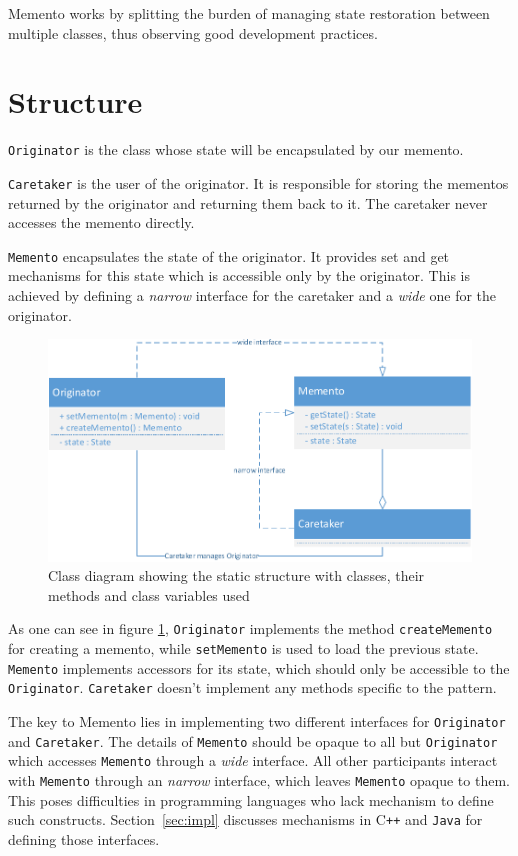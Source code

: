 \documentclass[11pt, a4paper, twoside]{article}
\def\cpp{C{}\texttt{++}}
\begin{document}
	 Memento works by splitting the burden of managing state restoration between multiple classes, thus observing good development practices.
	 	
	\section{Structure}
	\verb|Originator| is the class whose state will be encapsulated by our memento.
	
	\verb|Caretaker| is the user of the originator. It is responsible for storing the mementos returned by the originator and returning them back to it. The caretaker never accesses the memento directly.
	
	\verb|Memento| encapsulates the state of the originator. It provides set and get mechanisms for this state which is accessible only by the originator. This is achieved by defining a \emph{narrow} interface for the caretaker and a \emph{wide} one for the originator.
	
	\begin{figure}[htb]
		\begin{center}
			\includegraphics[width=\textwidth]{class_diagram.pdf}
			\caption{Class diagram showing the static structure with classes, their methods and class variables used}
			\label{fig:class}
		\end{center}
	\end{figure}
	
	As one can see in figure \ref{fig:class}, \verb|Originator| implements the method \verb|createMemento| for creating a memento, while \verb|setMemento| is used to load the previous state. \verb|Memento| implements accessors for its state, which should only be accessible to the \verb|Originator|. \verb|Caretaker| doesn't implement any methods specific to the pattern.
	
	The key to Memento lies in implementing two different interfaces for \verb|Originator| and \verb|Caretaker|. The details of \verb|Memento| should be opaque to all but \verb|Originator| which accesses \verb|Memento| through a \emph{wide} interface. All other participants interact with \verb|Memento| through an \emph{narrow} interface, which leaves \verb|Memento| opaque to them. This poses difficulties in programming languages who lack mechanism to define such constructs. Section~\ref{sec:impl} discusses mechanisms in \cpp{} and \verb|Java| for defining those interfaces.
	
\end{document}
